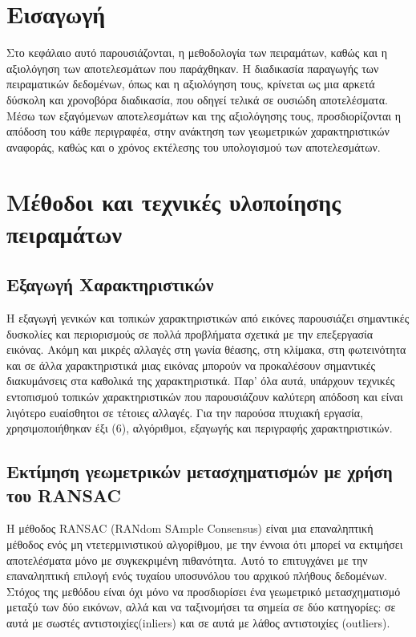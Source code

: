 \section{Εισαγωγή}

Στο κεφάλαιο αυτό παρουσιάζονται, η μεθοδολογία των πειραμάτων,
καθώς και η αξιολόγηση των αποτελεσμάτων που παράχθηκαν.
Η διαδικασία παραγωγής των πειραματικών δεδομένων, όπως και η αξιολόγηση τους, 
κρίνεται ως μια αρκετά δύσκολη και χρονοβόρα διαδικασία, που οδηγεί τελικά σε ουσιώδη αποτελέσματα. 
Μέσω των εξαγόμενων αποτελεσμάτων και της αξιολόγησης τους, προσδιορίζονται η απόδοση του
κάθε περιγραφέα, στην ανάκτηση των γεωμετρικών χαρακτηριστικών αναφοράς,
καθώς και ο χρόνος εκτέλεσης του υπολογισμού των αποτελεσμάτων.

\section{Μέθοδοι και τεχνικές υλοποίησης πειραμάτων}

 \subsection{Εξαγωγή Χαρακτηριστικών}
 
 
 Η εξαγωγή γενικών και τοπικών χαρακτηριστικών από εικόνες παρουσιάζει σημαντικές 
δυσκολίες και περιορισμούς σε πολλά προβλήματα σχετικά με την επεξεργασία εικόνας. 
Ακόμη και μικρές αλλαγές στη γωνία θέασης, στη κλίμακα, στη φωτεινότητα και σε άλλα
χαρακτηριστικά μιας εικόνας μπορούν να προκαλέσουν σημαντικές διακυμάνσεις στα καθολικά 
της χαρακτηριστικά. Παρ' όλα αυτά, υπάρχουν τεχνικές εντοπισμού τοπικών χαρακτηριστικών 
που παρουσιάζουν καλύτερη απόδοση και είναι λιγότερο ευαίσθητοι σε τέτοιες αλλαγές.
 Για την παρούσα πτυχιακή εργασία, χρησιμοποιήθηκαν έξι (6), αλγόριθμοι, εξαγωγής και
περιγραφής χαρακτηριστικών.
  
  \newpage
  
  
 \subsection{Εκτίμηση γεωμετρικών μετασχηματισμών με χρήση του RANSAC} 
 
  Η μέθοδος RANSAC (RANdom SAmple Consensus) είναι μια επαναληπτική μέθοδος ενός μη ντετερμινιστικού αλγορίθμου, με την έννοια
  ότι μπορεί να εκτιμήσει αποτελέσματα μόνο με συγκεκριμένη πιθανότητα. Αυτό το επιτυγχάνει με την επαναληπτική επιλογή 
  ενός τυχαίου υποσυνόλου του αρχικού πλήθους δεδομένων. Στόχος της μεθόδου είναι όχι μόνο να προσδιορίσει ένα γεωμετρικό μετασχηματισμό μεταξύ των δύο εικόνων, 
  αλλά και να ταξινομήσει τα σημεία σε δύο κατηγορίες: σε αυτά με σωστές αντιστοιχίες(inliers) και σε αυτά με λάθος αντιστοιχίες (outliers).
  
